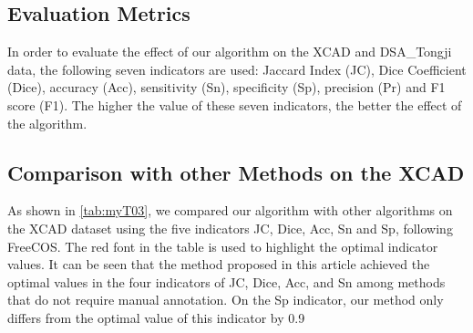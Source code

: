 \subsection{Evaluation Metrics}
In order to evaluate the effect of our algorithm on the XCAD and DSA\_Tongji data, the following seven indicators are used: Jaccard Index (JC), Dice Coefficient (Dice), accuracy (Acc), sensitivity (Sn), specificity (Sp), precision (Pr) and F1 score (F1). The higher the value of these seven indicators, the better the effect of the algorithm.
\subsection{Comparison with other Methods on the XCAD}
As shown in \cref{tab:myT03}, we compared our algorithm with other algorithms on the XCAD dataset using the five indicators JC, Dice, Acc, Sn and Sp, following FreeCOS\cite{02.01.FreeCOS}. The red font in the table is used to highlight the optimal indicator values. It can be seen that the method proposed in this article achieved the optimal values in the four indicators of JC, Dice, Acc, and Sn among methods that do not require manual annotation. On the Sp indicator, our method only differs from the optimal value of this indicator by 0.9%

